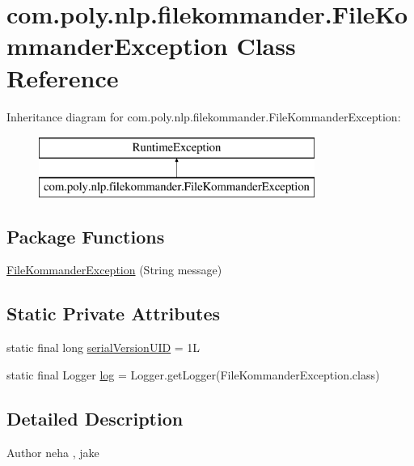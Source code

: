 \hypertarget{classcom_1_1poly_1_1nlp_1_1filekommander_1_1_file_kommander_exception}{\section{com.\-poly.\-nlp.\-filekommander.\-File\-Kommander\-Exception Class Reference}
\label{classcom_1_1poly_1_1nlp_1_1filekommander_1_1_file_kommander_exception}
}
Inheritance diagram for com.\-poly.\-nlp.\-filekommander.\-File\-Kommander\-Exception\-:\begin{figure}[H]
\begin{center}
\leavevmode
\includegraphics[height=2.000000cm]{classcom_1_1poly_1_1nlp_1_1filekommander_1_1_file_kommander_exception}
\end{center}
\end{figure}
\subsection*{Package Functions}
\begin{DoxyCompactItemize}
\item 
\hyperlink{classcom_1_1poly_1_1nlp_1_1filekommander_1_1_file_kommander_exception_afc4cc23418eef9956f58ec8ba5ba2596}{File\-Kommander\-Exception} (String message)
\end{DoxyCompactItemize}
\subsection*{Static Private Attributes}
\begin{DoxyCompactItemize}
\item 
static final long \hyperlink{classcom_1_1poly_1_1nlp_1_1filekommander_1_1_file_kommander_exception_a19ff8f8a19fadb69b360aa6f211065c6}{serial\-Version\-U\-I\-D} = 1\-L
\item 
static final Logger \hyperlink{classcom_1_1poly_1_1nlp_1_1filekommander_1_1_file_kommander_exception_ae1f8a429d874921e90fcf52f6996d18d}{log} = Logger.\-get\-Logger(File\-Kommander\-Exception.\-class)
\end{DoxyCompactItemize}


\subsection{Detailed Description}
\begin{DoxyAuthor}{Author}
neha , jake 
\end{DoxyAuthor}



